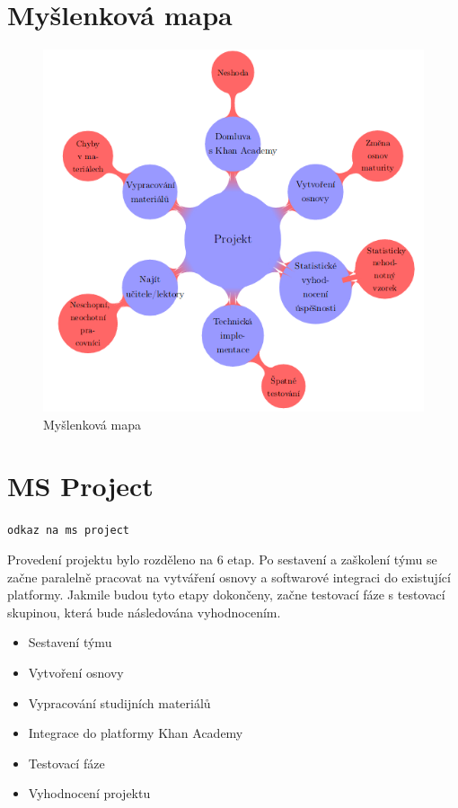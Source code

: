\documentclass[12pt, a4paper]{report}
\begin{document}
\chapter{Myšlenková mapa}
\label{sec:orgcabfeb6}
\begin{figure}[htbp]
\centering
\includegraphics[width=.9\linewidth]{./images/myslenkova_mapa.png}
\caption{\label{fig:myslenkova_mapa}
Myšlenková mapa}
\end{figure}



\chapter{MS Project}
\label{sec:org4918916}

\texttt{odkaz na ms project}

Provedení projektu bylo rozděleno na 6 etap. Po sestavení a zaškolení týmu se začne paralelně pracovat na vytváření osnovy a softwarové integraci do existující platformy. Jakmile budou tyto etapy dokončeny, začne testovací fáze s testovací skupinou, která bude následována vyhodnocením.

\begin{itemize}
\item Sestavení týmu
\item Vytvoření osnovy
\item Vypracování studijních materiálů
\item Integrace do platformy Khan Academy
\item Testovací fáze
\item Vyhodnocení projektu
\end{itemize}
\end{document}
